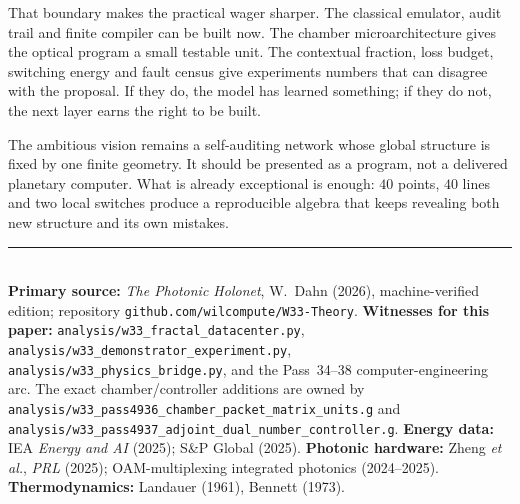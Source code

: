 \documentclass[11pt]{article}
\begin{document}
That boundary makes the practical wager sharper. The classical emulator, audit trail and finite
compiler can be built now. The chamber microarchitecture gives the optical program a small testable
unit. The contextual fraction, loss budget, switching energy and fault census give experiments numbers
that can disagree with the proposal. If they do, the model has learned something; if they do not, the
next layer earns the right to be built.

The ambitious vision remains a self-auditing network whose global structure is fixed by one finite
geometry. It should be presented as a program, not a delivered planetary computer. What is already
exceptional is enough: $40$ points, $40$ lines and two local switches produce a reproducible algebra
that keeps revealing both new structure and its own mistakes.

\bigskip
\noindent\rule{\linewidth}{0.4pt}\\[0.3em]
{\footnotesize \textbf{Primary source:} \emph{The Photonic Holonet}, W.~Dahn (2026), machine-verified
edition; repository \texttt{github.com/wilcompute/W33-Theory}. \textbf{Witnesses for this paper:}
\texttt{analysis/w33\_fractal\_datacenter.py}, \texttt{analysis/w33\_demonstrator\_experiment.py},
\texttt{analysis/w33\_physics\_bridge.py}, and the Pass~34--38 computer-engineering arc.
The exact chamber/controller additions are owned by
\texttt{analysis/w33\_pass4936\_chamber\_packet\_matrix\_units.g} and
\texttt{analysis/w33\_pass4937\_adjoint\_dual\_number\_controller.g}.
\textbf{Energy data:} IEA \emph{Energy and AI} (2025); S\&P Global (2025). \textbf{Photonic hardware:}
Zheng \emph{et al.}, \emph{PRL} (2025); OAM-multiplexing integrated photonics (2024--2025).
\textbf{Thermodynamics:} Landauer (1961), Bennett (1973).}
\end{document}
